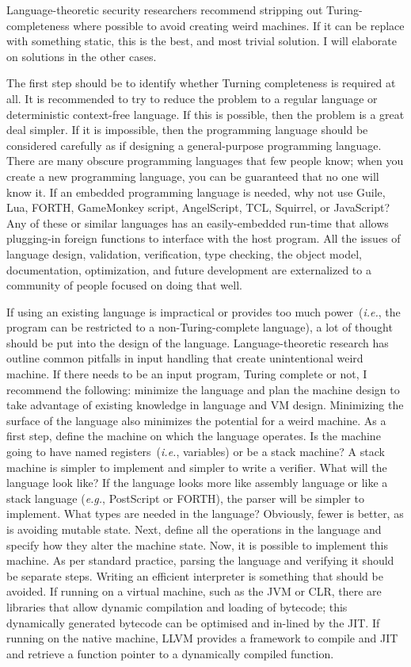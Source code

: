\documentclass[letterpaper,twocolumn,10pt]{article}
\begin{document}
\noindent Language-theoretic security researchers recommend stripping out Turing-completeness where possible to avoid creating weird machines. If it can be replace with something static, this is the best, and most trivial solution. I will elaborate on solutions in the other cases.

The first step should be to identify whether Turning completeness is required at all. It is recommended to try to reduce the problem to a regular language or deterministic context-free language. If this is possible, then the problem is a great deal simpler. If it is impossible, then the programming language should be considered carefully as if designing a general-purpose programming language. There are many obscure programming languages that few people know; when you create a new programming language, you can be guaranteed that no one will know it.\cite{kws} If an embedded programming language is needed, why not use Guile, Lua, FORTH, GameMonkey script, AngelScript, TCL, Squirrel, or JavaScript? Any of these or similar languages has an easily-embedded run-time that allows plugging-in foreign functions to interface with the host program. All the issues of language design, validation, verification, type checking, the object model, documentation, optimization, and future development are externalized to a community of people focused on doing that well.

If using an existing language is impractical or provides too much power~(\emph{i.e.}, the program can be restricted to a non-Turing-complete language), a lot of thought should be put into the design of the language. Language-theoretic research has outline common pitfalls in input handling that create unintentional weird machine.\cite{weird} If there needs to be an input program, Turing complete or not, I recommend the following: minimize the language and plan the machine design to take advantage of existing knowledge in language and VM design. Minimizing the surface of the language also minimizes the potential for a weird machine. As a first step, define the machine on which the language operates. Is the machine going to have named registers~(\emph{i.e.}, variables) or be a stack machine? A stack machine is simpler to implement and simpler to write a verifier. What will the language look like? If the language looks more like assembly language or like a stack language (\emph{e.g.}, PostScript or FORTH), the parser will be simpler to implement. What types are needed in the language? Obviously, fewer is better, as is avoiding mutable state. Next, define all the operations in the language and specify how they alter the machine state. Now, it is possible to implement this machine. As per standard practice, parsing the language and verifying it should be separate steps. Writing an efficient interpreter is something that should be avoided. If running on a virtual machine, such as the JVM or CLR, there are libraries that allow dynamic compilation and loading of bytecode; this dynamically generated bytecode can be optimised and in-lined by the JIT. If running on the native machine, LLVM provides a framework to compile and JIT and retrieve a function pointer to a dynamically compiled function.
\end{document}
